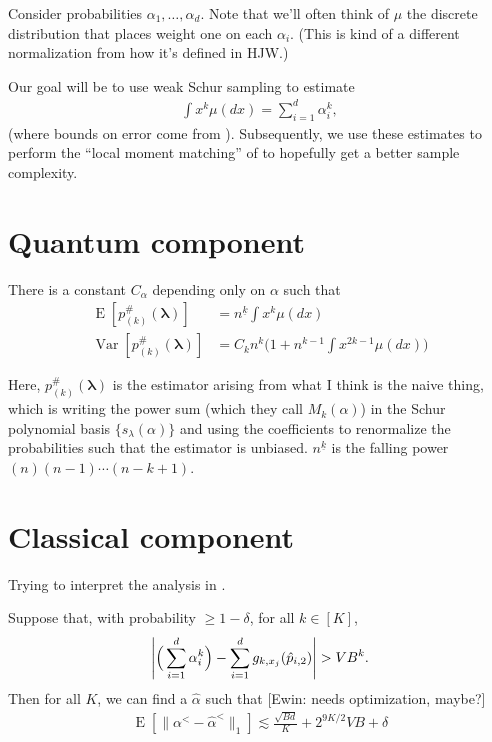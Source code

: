 \documentclass{article}
\theoremstyle{definition}
\DeclareMathOperator{\E}{E}
\DeclareMathOperator{\Var}{Var}
\DeclarePairedDelimiter{\abs}{\lvert}{\rvert}
\newcommand{\ewin}[1]{\textrm{\textcolor[RGB]{0,135,219}{[Ewin: #1]}}}
\begin{document}
Consider probabilities $\alpha_1,\ldots,\alpha_d$.
Note that we'll often think of $\mu$ the discrete distribution that places weight one on each $\alpha_i$.
(This is kind of a different normalization from how it's defined in HJW.)

Our goal will be to use weak Schur sampling to estimate
\begin{align*}
    \int x^k \mu(dx) = \sum_{i=1}^d \alpha_i^k,
\end{align*}
(where bounds on error come from \cite{aisw19}).
Subsequently, we use these estimates to perform the ``local moment matching'' of \cite{hjw18} to hopefully get a better sample complexity.

\section{Quantum component}

\begin{lemma}
    There is a constant $C_\alpha$ depending only on $\alpha$ such that
    \begin{align}
        \E[p_{(k)}^{\#}(\bm{\lambda})] &= n^{\underline{k}}\int x^k\mu(dx) \\
        \Var[p_{(k)}^{\#}(\bm{\lambda})] &= C_k n^{k}\Big(1 + n^{k - 1}\int x^{2k-1}\mu(dx)\Big)
    \end{align}
\end{lemma}

Here, $p_{(k)}^\#(\bm{\lambda})$ is the estimator arising from what I think is the naive thing, which is writing the power sum (which they call $M_k(\alpha)$) in the Schur polynomial basis $\{s_\lambda(\alpha)\}$ and using the coefficients to renormalize the probabilities such that the estimator is unbiased. $n^{\underline{k}}$ is the falling power $(n)(n-1)\cdots(n-k+1)$.

\section{Classical component}

Trying to interpret the analysis in \cite{hjw18}.

\begin{theorem}
Suppose that, with probability $\geq 1-\delta$, for all $k \in [K]$,
\begin{align*}
    \abs*{\Big(\sum_{i=1}^d \alpha_i^k\Big) - \sum_{i=1}^d g_{k,x_j}(\hat{p}_{i,2})} > VB^k.
\end{align*}
Then for all $K$, we can find a $\hat{\alpha}$ such that \ewin{needs optimization, maybe?}
\begin{align*}
    \E[\|\alpha^< - \hat{\alpha}^<\|_1] \lesssim \frac{\sqrt{Bd}}{K} + 2^{9K/2}VB + \delta
\end{align*}
\end{theorem}
\end{document}
